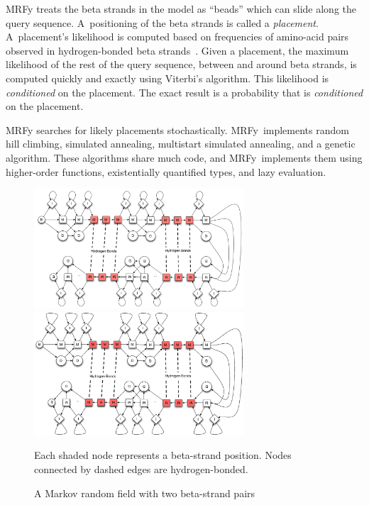 \documentclass[preprint,nonatbib,blockstyle,times]{sigplanconf}
\newcommand\mrfy{MRFy} %
\let\cite\citep
\begin{document}
%
%
MRFy treats the beta 
strands in the model
 as ``beads'' which can slide along the query sequence.
A~positioning of the beta strands is called
 a \emph{placement}.
A~placement's likelihood is computed
based on frequencies of amino-acid pairs observed in 
hydrogen-bonded beta strands~\cite{Cowen:2002p588}.
Given a placement, the maximum likelihood of the rest of
the query sequence, between and around beta strands,
is computed quickly and exactly 
using Viterbi's algorithm.
\ifpagetuning
This likelihood is \emph{conditioned} on the placement.
\else
The exact result is a probability that is
\emph{conditioned} on the placement.
\fi

MRFy searches for likely placements stochastically.
\mrfy\ implements
random hill
climbing, simulated  
annealing, multistart simulated annealing, and a genetic algorithm.
These algorithms share much code, and \mrfy\ implements them using
higher-order functions, 
existentially 
quantified types, and lazy evaluation.

%
%
\begin{figure}
\ifpdfmadness
\centerline{\includegraphics[width=7.8cm]{mrf_interleave_diagram.pdf}} 
\else
\centerline{\includegraphics[width=7.8cm]{mrf_interleave_diagram.eps}} 
\fi
Each shaded node represents a beta-strand position.
Nodes connected by dashed edges are hydrogen-bonded.

\caption{A Markov random field with two beta-strand pairs}
\label{mrf} 
\end{figure}
\end{document}
